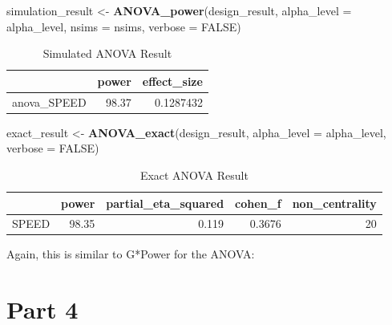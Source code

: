 \documentclass[]{book}
\newenvironment{Shaded}{\begin{snugshade}}{\end{snugshade}}
\newcommand{\DataTypeTok}[1]{\textcolor[rgb]{0.13,0.29,0.53}{#1}}
\newcommand{\KeywordTok}[1]{\textcolor[rgb]{0.13,0.29,0.53}{\textbf{#1}}}
\newcommand{\NormalTok}[1]{#1}
\newcommand{\OtherTok}[1]{\textcolor[rgb]{0.56,0.35,0.01}{#1}}
\newcommand{\StringTok}[1]{\textcolor[rgb]{0.31,0.60,0.02}{#1}}
\begin{document}
\begin{Shaded}
\begin{Highlighting}[]
\NormalTok{simulation_result <-}\StringTok{ }\KeywordTok{ANOVA_power}\NormalTok{(design_result, }
                                 \DataTypeTok{alpha_level =}\NormalTok{ alpha_level, }
                                 \DataTypeTok{nsims =}\NormalTok{ nsims,}
                                 \DataTypeTok{verbose =} \OtherTok{FALSE}\NormalTok{)}
\end{Highlighting}
\end{Shaded}

\begin{table}[!h]

\caption{\label{tab:unnamed-chunk-133}Simulated ANOVA Result}
\centering
\begin{tabular}{l|r|r}
\hline
  & power & effect\_size\\
\hline
anova\_SPEED & 98.37 & 0.1287432\\
\hline
\end{tabular}
\end{table}

\begin{Shaded}
\begin{Highlighting}[]
\NormalTok{exact_result <-}\StringTok{ }\KeywordTok{ANOVA_exact}\NormalTok{(design_result,}
                            \DataTypeTok{alpha_level =}\NormalTok{ alpha_level,}
                            \DataTypeTok{verbose =} \OtherTok{FALSE}\NormalTok{)}
\end{Highlighting}
\end{Shaded}

\begin{table}[!h]

\caption{\label{tab:unnamed-chunk-135}Exact ANOVA Result}
\centering
\begin{tabular}{l|r|r|r|r}
\hline
  & power & partial\_eta\_squared & cohen\_f & non\_centrality\\
\hline
SPEED & 98.35 & 0.119 & 0.3676 & 20\\
\hline
\end{tabular}
\end{table}

Again, this is similar to G*Power for the ANOVA:

\href{screenshots/gpower_4.png}{}

\hypertarget{part-4}{%
\section{Part 4}\label{part-4}}
\end{document}
